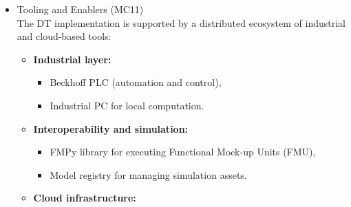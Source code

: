 \documentclass[
]{article}
\providecommand{\tightlist}{%
  \setlength{\itemsep}{0pt}\setlength{\parskip}{0pt}}
\begin{document}
\begin{itemize}
\begin{itemize}
\begin{itemize}
\begin{itemize}
\begin{itemize}
          \begin{itemize}
          \tightlist
          \item
            A \textbf{fault localization model} (decision tree),
            identifying which parameters of the physical model are
            responsible for observed discrepancies.
          \item
            A \textbf{fault estimation model} (LS‑SVR), estimating the
            corrected values of these parameters.
          \end{itemize}
        \item
          \textbf{Data structure:}\\
          The DT relies on a \textbf{data lake} that stores sensor
          measurements and simulation data. Training datasets for the ML
          models are generated using a combination of:

          \begin{itemize}
          \tightlist
          \item
            sampled control vectors (e.g., valve opening, pump speed),
          \item
            perturbed parameter sets of the simulation model (loss
            pressur in certain pipes),
          \item
            corresponding simulated process variables.
          \end{itemize}
        \end{itemize}
      \item
        Tooling and Enablers (MC11)\\
        The DT implementation is supported by a distributed ecosystem of
        industrial and cloud-based tools:

        \begin{itemize}
        \item
          \textbf{Industrial layer:}

          \begin{itemize}
          \tightlist
          \item
            Beckhoff PLC (automation and control),
          \item
            Industrial PC for local computation.
          \end{itemize}
        \item
          \textbf{Interoperability and simulation:}

          \begin{itemize}
          \tightlist
          \item
            FMPy library for executing Functional Mock-up Units (FMU),
          \item
            Model registry for managing simulation assets.
          \end{itemize}
        \item
          \textbf{Cloud infrastructure:}


\end{itemize}
\end{itemize}
\end{itemize}
\end{itemize}
\end{itemize}
\end{document}
